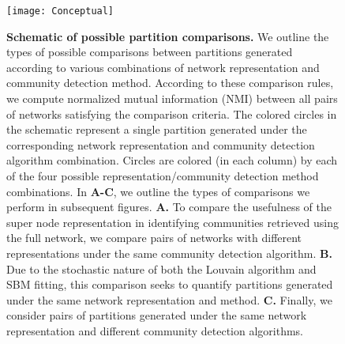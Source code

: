 \begin{figure}
\begin{center}
\texttt{[image: Conceptual]}
\caption{{\bf Schematic of possible partition comparisons.} We outline the types of possible comparisons between partitions generated according to various combinations of network representation and community detection method. According to these comparison rules, we compute normalized mutual information (NMI) between all pairs of networks satisfying the comparison criteria. The colored circles in the schematic represent a single partition generated under the corresponding  network representation and community detection algorithm combination. Circles are colored (in each column) by each of the four possible representation/community detection method combinations. In {\bf A-C}, we outline the types of comparisons we perform in subsequent figures. {\bf A.} To compare the usefulness of the super node representation in identifying communities retrieved using the full network, we compare pairs of networks with different representations under the same community detection algorithm. {\bf B.} Due to the stochastic nature of both the Louvain algorithm and SBM fitting, this comparison seeks to quantify partitions generated under the same network representation and method. {\bf C.} Finally, we consider pairs of partitions generated under the same network representation and different community detection algorithms. }
\label{concept}
\end{center}
\end{figure}

